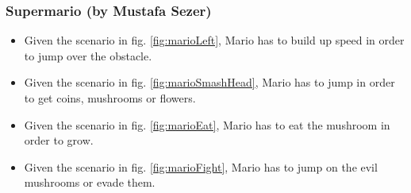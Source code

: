 \subsubsection{Supermario (by Mustafa Sezer)}
\begin{itemize}
	\item Given the scenario in fig. \ref{fig:marioLeft}, Mario has to build up speed in order to jump over the obstacle.
	\item Given the scenario in fig. \ref{fig:marioSmashHead}, Mario has to jump in order to get coins, mushrooms or flowers.
	\item Given the scenario in fig. \ref{fig:marioEat}, Mario has to eat the mushroom in order to grow.
	\item Given the scenario in fig. \ref{fig:marioFight}, Mario has to jump on the evil mushrooms or evade them.
\end{itemize}

